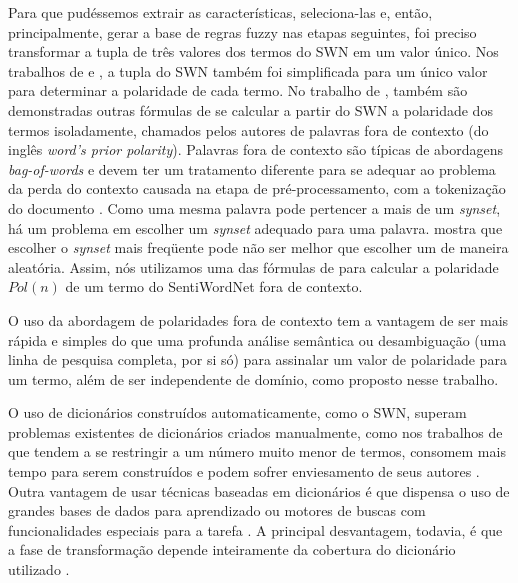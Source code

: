 \documentclass[template.tex]{subfiles}
\begin{document}
Para que pudéssemos extrair as características, seleciona-las e, então, principalmente, gerar a base de regras fuzzy nas etapas seguintes, foi preciso transformar a tupla de três valores dos termos do SWN em um valor único. Nos trabalhos de  e , a tupla do SWN também foi simplificada para um único valor para determinar a polaridade de cada termo. No trabalho de , também são demonstradas outras fórmulas de se calcular a partir do SWN a polaridade dos termos isoladamente, chamados pelos autores de palavras fora de contexto (do inglês \textit{word’s prior polarity}). Palavras fora de contexto são típicas de abordagens \textit{bag-of-words} e devem ter um tratamento diferente para se adequar ao problema da perda do contexto causada na etapa de pré-processamento, com a tokenização do documento \cite{guerini2013sentiment}. Como uma mesma palavra pode pertencer a mais de um \textit{synset}, há um problema em escolher um \textit{synset} adequado para uma palavra.  mostra que escolher o \textit{synset} mais freqüente pode não ser melhor que escolher um de maneira aleatória. Assim, nós utilizamos uma das fórmulas de  para calcular a polaridade $Pol(n)$ de um termo do SentiWordNet fora de contexto. 


O uso da abordagem de polaridades fora de contexto tem a vantagem de ser mais rápida e simples do que uma profunda análise semântica ou desambiguação (uma linha de pesquisa completa, por si só) para assinalar um valor de polaridade para um termo, além de ser independente de domínio, como proposto nesse trabalho. 

O uso de dicionários construídos automaticamente, como o SWN, superam problemas existentes de dicionários criados manualmente, como nos trabalhos de  que tendem a se restringir a um número muito menor de termos, consomem mais tempo para serem construídos e podem sofrer enviesamento de seus autores \cite{ohana2009sentiment}. Outra vantagem de usar técnicas baseadas em dicionários é que dispensa o uso de grandes bases de dados para aprendizado ou motores de buscas com funcionalidades especiais para a tarefa \cite{khan2011sentiment}. A principal desvantagem, todavia, é que a fase de  transformação depende inteiramente da cobertura do dicionário utilizado \cite{khan2011sentiment}. 
\end{document}
